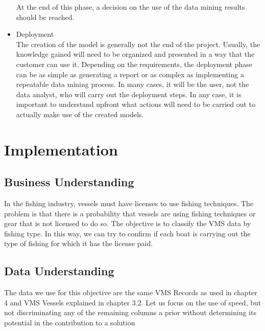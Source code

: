 \begin{itemize}
At the end of this phase, a decision on the use of the data mining results should be reached.
\item Deployment\\
The creation of the model is generally not the end of the project. Usually, the knowledge gained
will need to be organized and presented in a way that the customer can use it. Depending on
the requirements, the deployment phase can be as simple as generating a report or as complex
as implementing a repeatable data mining process. In many cases, it will be the user, not the
data analyst, who will carry out the deployment steps. In any case, it is important to
understand upfront what actions will need to be carried out to actually make use of
the created models.
\end{itemize}

\section{Implementation} %
\label{sub:implementation}

\subsection{Business Understanding} %
\label{sub:business_understanding}

In the fishing industry, vessels must have licenses to use fishing techniques.
The problem is that there is a probability that vessels are using fishing techniques or gear that is not licensed to do so.
The objective is to classify the VMS data by fishing type. 
In this way, we can try to confirm if each boat is carrying out the type of fishing for which it has the license paid.





\subsection{Data Understanding} %
\label{sub:data_understanding}

The data we use for this objective are the same VMS Records as used in chapter 4 and VMS Vessels explained in chapter 3.2.
Let us focus on the use of speed, but not discriminating any of the remaining columns a prior without determining its potential in the contribution to a solution




